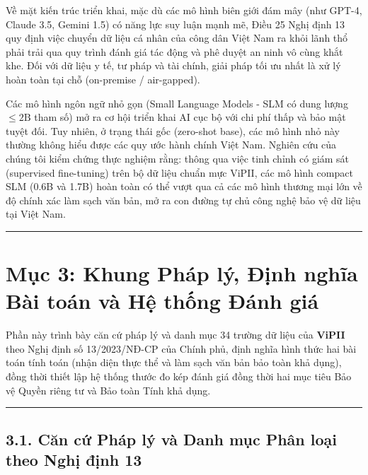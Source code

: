 \documentclass[
  11pt,
  a4paper,
]{article}
\begin{document}
Về mặt kiến trúc triển khai, mặc dù các mô hình biên giới đám mây (như GPT-4, Claude 3.5, Gemini
1.5) có năng lực suy luận mạnh mẽ, Điều 25 Nghị định 13 quy định việc chuyển dữ liệu cá nhân của
công dân Việt Nam ra khỏi lãnh thổ phải trải qua quy trình đánh giá tác động và phê duyệt an ninh vô
cùng khắt khe. Đối với dữ liệu y tế, tư pháp và tài chính, giải pháp tối ưu nhất là xử lý hoàn toàn
tại chỗ (on-premise / air-gapped).

Các mô hình ngôn ngữ nhỏ gọn (Small Language Models - SLM có dung lượng \(\le 2\text{B}\) tham số)
mở ra cơ hội triển khai AI cục bộ với chi phí thấp và bảo mật tuyệt đối. Tuy nhiên, ở trạng thái gốc
(zero-shot base), các mô hình nhỏ này thường không hiểu được các quy ước hành chính Việt Nam. Nghiên
cứu của chúng tôi kiểm chứng thực nghiệm rằng: thông qua việc tinh chỉnh có giám sát (supervised
fine-tuning) trên bộ dữ liệu chuẩn mực ViPII, các mô hình compact SLM (0.6B và 1.7B) hoàn toàn có
thể vượt qua cả các mô hình thương mại lớn về độ chính xác làm sạch văn bản, mở ra con đường tự chủ
công nghệ bảo vệ dữ liệu tại Việt Nam.

\begin{center}\rule{0.5\linewidth}{0.5pt}\end{center}

\section{Mục 3: Khung Pháp lý, Định nghĩa Bài toán và Hệ thống Đánh
giá}\label{mux1ee5c-3-khung-phuxe1p-luxfd-ux111ux1ecbnh-nghux129a-buxe0i-touxe1n-vuxe0-hux1ec7-thux1ed1ng-ux111uxe1nh-giuxe1}

Phần này trình bày căn cứ pháp lý và danh mục 34 trường dữ liệu của \textbf{ViPII} theo Nghị định số
13/2023/NĐ-CP của Chính phủ, định nghĩa hình thức hai bài toán tính toán (nhận diện thực thể và làm
sạch văn bản bảo toàn khả dụng), đồng thời thiết lập hệ thống thước đo kép đánh giá đồng thời hai
mục tiêu Bảo vệ Quyền riêng tư và Bảo toàn Tính khả dụng.

\begin{center}\rule{0.5\linewidth}{0.5pt}\end{center}

\subsection{3.1. Căn cứ Pháp lý và Danh mục Phân loại theo Nghị định
13}\label{cux103n-cux1ee9-phuxe1p-luxfd-vuxe0-danh-mux1ee5c-phuxe2n-loux1ea1i-theo-nghux1ecb-ux111ux1ecbnh-13}
\end{document}
